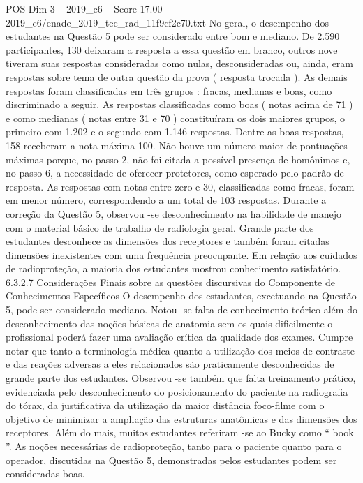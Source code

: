 \begin{textsample}{POS Dim 3 – 2019\_c6 – Score 17.00 – 2019\_c6/enade\_2019\_tec\_rad\_11f9cf2c70.txt}
No geral, o desempenho dos estudantes na Questão 5 pode ser considerado entre bom e mediano.
De 2.590 participantes, 130 deixaram a resposta a essa questão em branco, outros nove tiveram suas respostas consideradas como nulas, desconsideradas ou, ainda, eram respostas sobre tema de outra questão da prova ( resposta trocada ).
As demais respostas foram classificadas em três grupos : fracas, medianas e boas, como discriminado a seguir.
As respostas classificadas como boas ( notas acima de 71 ) e como medianas ( notas entre 31 e 70 ) constituíram os dois maiores grupos, o primeiro com 1.202 e o segundo com 1.146 respostas.
Dentre as boas respostas, 158 receberam a nota máxima 100.
Não houve um número maior de pontuações máximas porque, no passo 2, não foi citada a possível presença de homônimos e, no passo 6, a necessidade de oferecer protetores, como esperado pelo padrão de resposta.
As respostas com notas entre zero e 30, classificadas como fracas, foram em menor número, correspondendo a um total de 103 respostas.
Durante a correção da Questão 5, observou -se desconhecimento na habilidade de manejo com o material básico de trabalho de radiologia geral.
Grande parte dos estudantes desconhece as dimensões dos receptores e também foram citadas dimensões inexistentes com uma frequência preocupante.
Em relação aos cuidados de radioproteção, a maioria dos estudantes mostrou conhecimento satisfatório. 6.3.2.7 Considerações Finais sobre as questões discursivas do Componente de Conhecimentos Específicos O desempenho dos estudantes, excetuando na Questão 5, pode ser considerado mediano.
Notou -se falta de conhecimento teórico além do desconhecimento das noções básicas de anatomia sem os quais dificilmente o profissional poderá fazer uma avaliação crítica da qualidade dos exames.
Cumpre notar que tanto a terminologia médica quanto a utilização dos meios de contraste e das reações adversas a eles relacionados são praticamente desconhecidas de grande parte dos estudantes.
Observou -se também que falta treinamento prático, evidenciada pelo desconhecimento do posicionamento do paciente na radiografia do tórax, da justificativa da utilização da maior distância foco-filme com o objetivo de minimizar a ampliação das estruturas anatômicas e das dimensões dos receptores.
Além do mais, muitos estudantes referiram -se ao Bucky como “ book ”.
As noções necessárias de radioproteção, tanto para o paciente quanto para o operador, discutidas na Questão 5, demonstradas pelos estudantes podem ser consideradas boas.

\end{textsample}
